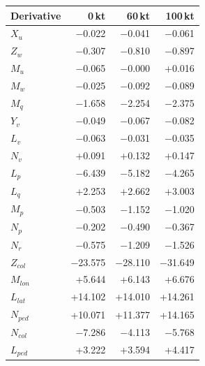 \begin{tabular}{@{}lrrr@{}}
\toprule
Derivative & 0\,kt & 60\,kt & 100\,kt \\
\midrule
$X_{u}$ & $-$0.022 & $-$0.041 & $-$0.061 \\
$Z_{w}$ & $-$0.307 & $-$0.810 & $-$0.897 \\
$M_{u}$ & $-$0.065 & $-$0.000 & +0.016 \\
$M_{w}$ & $-$0.025 & $-$0.092 & $-$0.089 \\
$M_{q}$ & $-$1.658 & $-$2.254 & $-$2.375 \\
$Y_{v}$ & $-$0.049 & $-$0.067 & $-$0.082 \\
$L_{v}$ & $-$0.063 & $-$0.031 & $-$0.035 \\
$N_{v}$ & +0.091 & +0.132 & +0.147 \\
$L_{p}$ & $-$6.439 & $-$5.182 & $-$4.265 \\
$L_{q}$ & +2.253 & +2.662 & +3.003 \\
$M_{p}$ & $-$0.503 & $-$1.152 & $-$1.020 \\
$N_{p}$ & $-$0.202 & $-$0.490 & $-$0.367 \\
$N_{r}$ & $-$0.575 & $-$1.209 & $-$1.526 \\
$Z_{col}$ & $-$23.575 & $-$28.110 & $-$31.649 \\
$M_{lon}$ & +5.644 & +6.143 & +6.676 \\
$L_{lat}$ & +14.102 & +14.010 & +14.261 \\
$N_{ped}$ & +10.071 & +11.377 & +14.165 \\
$N_{col}$ & $-$7.286 & $-$4.113 & $-$5.768 \\
$L_{ped}$ & +3.222 & +3.594 & +4.417 \\
\bottomrule
\end{tabular}
